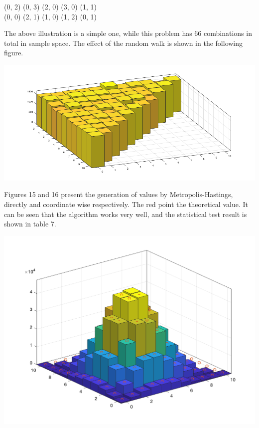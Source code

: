 (0, 2) (0, 3) (2, 0) (3, 0) (1, 1) \\ 
(0, 0) (2, 1) (1, 0) (1, 2) (0, 1)

The above illustration is a simple one, while this problem has 66 combinations in total in sample space. The effect of the random walk is shown in the following figure.

\begin{center}
    \includegraphics[scale=0.6]{Figures/figure6_7.png}\\
\end{center}

Figures 15 and 16 present the generation of values by Metropolis-Hastings, directly and coordinate wise respectively. The red point the theoretical value. It can be seen that the algorithm works very well, and the statistical test result is shown in table 7.

\begin{center}
    \includegraphics[scale=0.6]{Figures/figure6_3.png}\\
\end{center}

